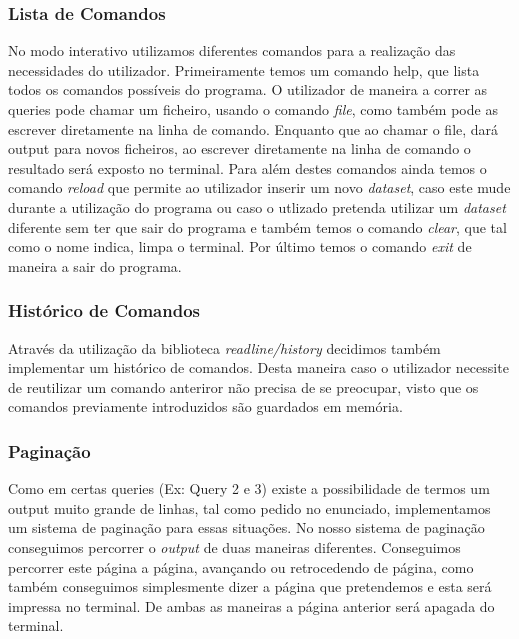 \documentclass{article}
\begin{document}
        \subsubsection{Lista de Comandos}
            No modo interativo utilizamos diferentes comandos para a realização das necessidades do
            utilizador. Primeiramente temos um comando help, que lista todos os comandos possíveis 
            do programa. O utilizador de maneira a correr as queries pode chamar um ficheiro, usando 
            o comando \emph{file}, como também pode as escrever diretamente na linha de comando. Enquanto 
            que ao chamar o file, dará output para novos ficheiros, ao escrever diretamente na linha de 
            comando o resultado será exposto no terminal. Para além destes comandos ainda temos o comando 
            \emph{reload} que permite ao utilizador inserir um novo \emph{dataset}, caso este mude durante 
            a utilização do programa ou caso o utlizado pretenda utilizar um \emph{dataset} diferente sem 
            ter que sair do programa e também temos o comando \emph{clear}, que tal como o nome indica, 
            limpa o terminal. Por último temos o comando \emph{exit} de maneira a sair do programa.
        \subsubsection{Histórico de Comandos}
            Através da utilização da biblioteca \emph{readline/history} decidimos também implementar um 
            histórico de comandos. Desta maneira caso o utilizador necessite de reutilizar um comando 
            anteriror não precisa de se preocupar, visto que os comandos previamente introduzidos são 
            guardados em memória.
        \subsubsection{Paginação}
            Como em certas queries (Ex: Query 2 e 3) existe a possibilidade de termos um output muito 
            grande de linhas, tal como pedido no enunciado, implementamos um sistema de paginação para essas situações.
            No nosso sistema de paginação conseguimos percorrer o \emph{output} de duas maneiras diferentes.
            Conseguimos percorrer este página a página, avançando ou retrocedendo de página, como também 
            conseguimos simplesmente dizer a página que pretendemos e esta será impressa no terminal. De 
            ambas as maneiras a página anterior será apagada do terminal.
\end{document}
